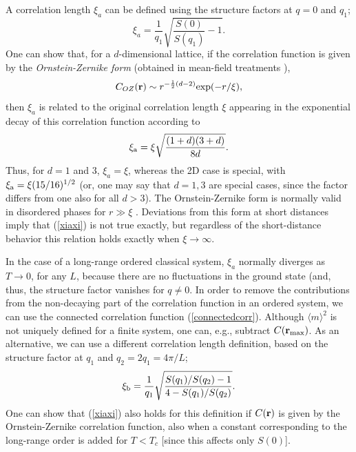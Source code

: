 \documentclass[draft,numberedheadings]{aipproc}
\begin{document}
A correlation length $\xi_a$ can be defined using the structure factors at $q=0$ and $q_1$;
\begin{equation}
\xi_a = \frac{1}{q_1} \sqrt{\frac{S(0)}{S(q_1)}-1}.
\label{xiadef}
\end{equation}
One can show that, for a $d$-dimensional lattice,
if the correlation function is given by the {\it Ornstein-Zernike form} (obtained in mean-field treatments \cite{cardy}),
\begin{equation}
C_{OZ}({\bf r}) \sim r^{-\frac{1}{2}(d-2)}{\rm exp}(-r/\xi),
\label{ozform}
\end{equation}
then $\xi_a$ is related to the original correlation length $\xi$ appearing in the exponential decay of this correlation function according to
\begin{equation}
\xi_{\rm a} = \xi \sqrt{\frac{(1+d)(3+d)}{8d}}.
\label{xiaxi}
\end{equation}
Thus, for $d=1$ and $3$, $\xi_a=\xi$, whereas the 2D case is special, with $\xi_{\rm a} = \xi (15/16)^{1/2}$ (or, one may say that 
$d=1,3$ are special cases, since the factor differs from one also for all $d>3$). The Ornstein-Zernike form is normally valid in disordered phases 
for $r \gg \xi$ \cite{cardy}. Deviations from this form at short distances imply that (\ref{xiaxi}) is not true exactly, but regardless of the 
short-distance behavior this relation holds exactly when $\xi \to \infty$.

In the case of a long-range ordered classical system, $\xi_a$ normally diverges as $T\to 0$, for any $L$, because there are no fluctuations
in the ground state (and, thus, the structure factor vanishes for $q\not =0$. In order to remove the contributions from the non-decaying part 
of the correlation function in an ordered system, we can use the connected correlation function (\ref{connectedcorr}). Although $\langle m\rangle^2$ 
is not uniquely defined for a finite system, one can, e.g., subtract $C({\bf r}_{\rm max})$. As an alternative, we can use a different correlation 
length definition, based on the structure factor at $q_1$ and $q_2=2q_1=4\pi/L$;
\begin{equation}
\xi_{\rm b} = \frac{1}{q_1}\sqrt{\frac{S(q_1)/S(q_2)-1}{4-S(q_1)/S(q_2)}}.
\label{xibdef}
\end{equation}
One can show that (\ref{xiaxi}) also holds for this definition if $C({\bf r})$ is given by the Ornstein-Zernike correlation function, also when a constant 
corresponding to the long-range order is added for $T<T_c$ [since this affects only $S({0})$].
\end{document}
